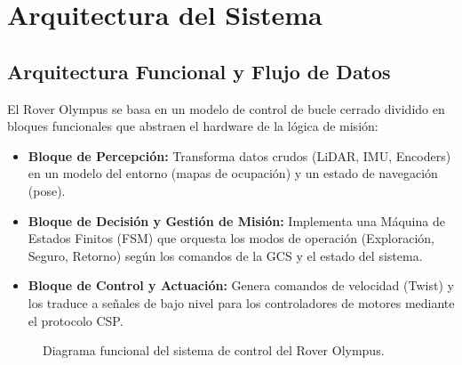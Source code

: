 \section{Arquitectura del Sistema}

\subsection{Arquitectura Funcional y Flujo de Datos}
El Rover Olympus se basa en un modelo de control de bucle cerrado dividido en bloques funcionales que abstraen el hardware de la lógica de misión:

\begin{itemize}
    \item \textbf{Bloque de Percepción:} Transforma datos crudos (LiDAR, IMU, Encoders) en un modelo del entorno (mapas de ocupación) y un estado de navegación (pose).
    \item \textbf{Bloque de Decisión y Gestión de Misión:} Implementa una Máquina de Estados Finitos (FSM) que orquesta los modos de operación (Exploración, Seguro, Retorno) según los comandos de la GCS y el estado del sistema.
    \item \textbf{Bloque de Control y Actuación:} Genera comandos de velocidad (Twist) y los traduce a señales de bajo nivel para los controladores de motores mediante el protocolo CSP.
\end{itemize}

\begin{figure}[H]
    \centering
    \shorthandoff{>}\shorthandoff{<}
    \shorthandon{>}\shorthandon{<}
    \caption{Diagrama funcional del sistema de control del Rover Olympus.}
    \label{fig:diagrama_funcional}
\end{figure}

